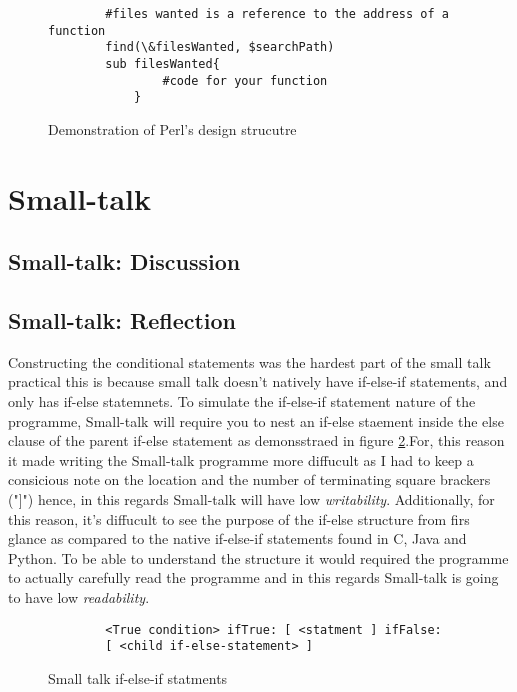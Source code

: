 \documentclass[
	12pt, %
]{fphw}
\begin{document}
\begin{figure}[!htp]
    \begin{problem}
        \begin{verbatim}
        #files wanted is a reference to the address of a function
        find(\&filesWanted, $searchPath)
        sub filesWanted{
                #code for your function
            }
        \end{verbatim}
    \end{problem}
    \caption{Demonstration of Perl's design strucutre}
    \label{Perl:demo}
\end{figure}

\section{Small-talk}

\subsection{Small-talk: Discussion}

\subsection{Small-talk: Reflection}

Constructing the conditional statements was the hardest part of the small talk
practical this is because small talk doesn't natively have if-else-if statements,
and only has if-else statemnets. To simulate the if-else-if statement nature of the
programme, Small-talk will require you to nest an if-else staement inside the else
clause of the parent if-else statement as demonsstraed in figure \ref{ST:IF_ELSE}.For,
this reason it made writing the Small-talk programme more diffucult as I had to
keep a consicious note on the location and the number of terminating square brackers
("]") hence, in this regards Small-talk will have low \emph{writability}. Additionally,
for this reason, it's diffucult to see the purpose of the if-else structure from firs
glance as compared to the native if-else-if statements found in C, Java and Python. To
be able to understand the structure it would required the programme to actually
carefully read the programme and in this regards Small-talk is going to have
low \emph{readability}.

\begin{figure}[!htp]
    \begin{problem}
        \begin{verbatim}
        <True condition> ifTrue: [ <statment ] ifFalse:
        [ <child if-else-statement> ]
        \end{verbatim}
    \end{problem}
    \caption{Small talk if-else-if statments}
    \label{ST:IF_ELSE}
\end{figure}
\end{document}
